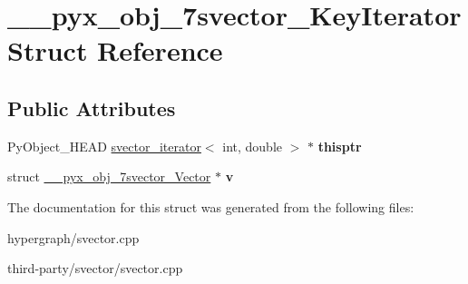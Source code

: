 \hypertarget{struct____pyx__obj__7svector__KeyIterator}{
\section{\_\-\_\-pyx\_\-obj\_\-7svector\_\-KeyIterator Struct Reference}
\label{struct____pyx__obj__7svector__KeyIterator}
}
\subsection*{Public Attributes}
\begin{DoxyCompactItemize}
\item 
\hypertarget{struct____pyx__obj__7svector__KeyIterator_a7f1d6bf6d4e702577dbc5c7e047aa40e}{
PyObject\_\-HEAD \hyperlink{structsvector__iterator}{svector\_\-iterator}$<$ int, double $>$ $\ast$ {\bfseries thisptr}}
\label{struct____pyx__obj__7svector__KeyIterator_a7f1d6bf6d4e702577dbc5c7e047aa40e}

\item 
\hypertarget{struct____pyx__obj__7svector__KeyIterator_a1d0872a1d18cd2a5d70153aa8d8faacd}{
struct \hyperlink{struct____pyx__obj__7svector__Vector}{\_\-\_\-pyx\_\-obj\_\-7svector\_\-Vector} $\ast$ {\bfseries v}}
\label{struct____pyx__obj__7svector__KeyIterator_a1d0872a1d18cd2a5d70153aa8d8faacd}

\end{DoxyCompactItemize}


The documentation for this struct was generated from the following files:\begin{DoxyCompactItemize}
\item 
hypergraph/svector.cpp\item 
third-\/party/svector/svector.cpp\end{DoxyCompactItemize}
